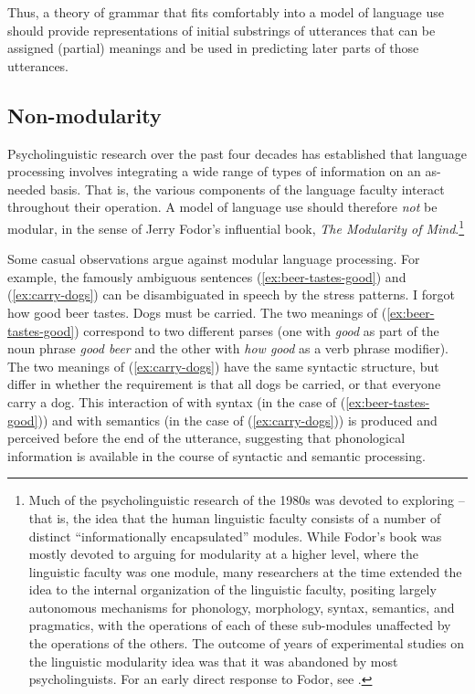\documentclass[output=paper
 	        ,biblatex
                ,babelshorthands
                ,newtxmath
                ,draftmode
                ,colorlinks, citecolor=brown
]{langscibook}
\begin{document}
Thus, a theory of grammar that fits comfortably into a model of language use should provide
representations of initial substrings of utterances that can be assigned (partial) meanings and be
used in predicting later parts of those utterances. 

\subsection{Non-modularity}

\largerpage
Psycholinguistic research over the past four decades has established that language processing
involves integrating a wide range of types of information on an as-needed basis.  That is, the
various components of the language faculty interact throughout their operation.  A model of language
use should therefore \emph{not} be modular, in the sense of Jerry Fodor's influential
\citeyear{Fodor83a-u} book, \emph{The Modularity of Mind}.\footnote{Much of the psycholinguistic
  research of the 1980s was devoted to exploring  -- that is, the idea that the
  human linguistic faculty consists of a number of distinct ``informationally encapsulated''
  modules.  While Fodor's book was mostly devoted to arguing for modularity at a higher level, where
  the linguistic faculty was one module, many researchers at the time extended the idea to the
  internal organization of the linguistic faculty, positing largely autonomous mechanisms for
  phonology, morphology, syntax, semantics, and pragmatics, with the operations of each of these
  sub-modules unaffected by the operations of the others. The outcome of years of experimental
  studies on the linguistic modularity idea was that it was abandoned by most psycholinguists. For
  an early direct response to Fodor, see \citet{MarslenTyler87}.}

Some casual observations argue against modular language processing.  For example, the famously
ambiguous sentences (\ref{ex:beer-tastes-good}) and (\ref{ex:carry-dogs}) can be disambiguated in
speech by the stress patterns.
\eal
\ex I forgot how good beer tastes.\label{ex:beer-tastes-good}
\ex Dogs must be carried.\label{ex:carry-dogs}
\zl
The two meanings of (\ref{ex:beer-tastes-good}) correspond to two different parses (one with \emph{good} as part of the noun phrase \emph{good beer} and the other with \emph{how good} as a verb phrase modifier).  The two meanings of (\ref{ex:carry-dogs}) have the same syntactic structure, but differ in whether the requirement is that all dogs be carried, or that everyone carry a dog.  This interaction of  with syntax (in the case of (\ref{ex:beer-tastes-good})) and with semantics (in the case of (\ref{ex:carry-dogs})) is produced and perceived before the end of the utterance, suggesting that phonological information is available in the course of syntactic and semantic processing.  
\end{document}
